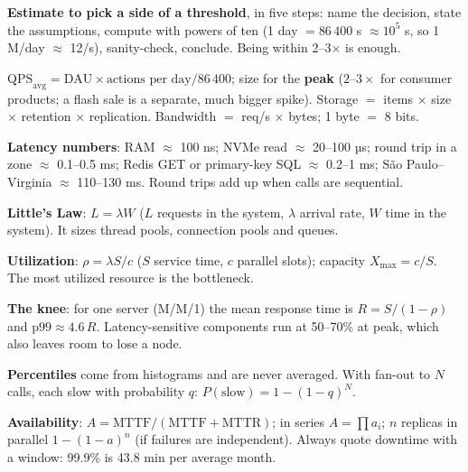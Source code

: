 \stages{\stEstimate\ \stDeep}

\begin{know}
  \item \textbf{Estimate to pick a side of a threshold}, in five steps: name the decision, state the assumptions, compute with powers of ten (1 day $= 86\,400$ s $\approx 10^5$ s, so 1 M/day $\approx$ 12/s), sanity-check, conclude. Being within 2--3$\times$ is enough.
  \item $\text{QPS}_\text{avg} = \text{DAU} \times \text{actions per day} / 86\,400$; size for the \textbf{peak} ($2$--$3\times$ for consumer products; a flash sale is a separate, much bigger spike). Storage $=$ items $\times$ size $\times$ retention $\times$ replication. Bandwidth $=$ req/s $\times$ bytes; 1 byte $=$ 8 bits.
  \item \textbf{Latency numbers}: RAM $\approx$ 100 ns; NVMe read $\approx$ 20--100 µs; round trip in a zone $\approx$ 0.1--0.5 ms; Redis GET or primary-key SQL $\approx$ 0.2--1 ms; São Paulo--Virginia $\approx$ 110--130 ms. Round trips add up when calls are sequential.
  \item \textbf{Little's Law}: $L = \lambda W$ ($L$ requests in the system, $\lambda$ arrival rate, $W$ time in the system). It sizes thread pools, connection pools and queues.
  \item \textbf{Utilization}: $\rho = \lambda S / c$ ($S$ service time, $c$ parallel slots); capacity $X_{\max} = c/S$. The most utilized resource is the bottleneck.
  \item \textbf{The knee}: for one server (M/M/1) the mean response time is $R = S/(1-\rho)$ and $\text{p99} \approx 4.6\,R$. Latency-sensitive components run at 50--70\% at peak, which also leaves room to lose a node.
  \item \textbf{Percentiles} come from histograms and are never averaged. With fan-out to $N$ calls, each slow with probability $q$: $P(\text{slow}) = 1 - (1-q)^N$.
  \item \textbf{Availability}: $A = \text{MTTF}/(\text{MTTF} + \text{MTTR})$; in series $A = \prod a_i$; $n$ replicas in parallel $1 - (1-a)^n$ (if failures are independent). Always quote downtime with a window: 99.9\% is 43.8 min per average month.
\end{know}

